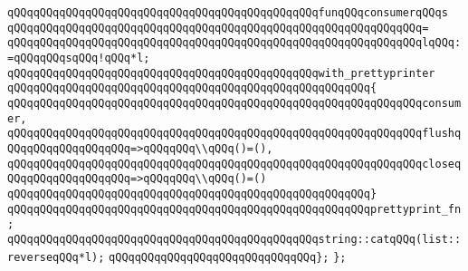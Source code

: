 \verb|qQQqqQQqqQQqqQQqqQQqqQQqqQQqqQQqqQQqqQQqqQQqqQQqfunqQQqconsumerqQQqs|\newline
\verb|qQQqqQQqqQQqqQQqqQQqqQQqqQQqqQQqqQQqqQQqqQQqqQQqqQQqqQQqqQQqqQQq=|\newline
\verb|qQQqqQQqqQQqqQQqqQQqqQQqqQQqqQQqqQQqqQQqqQQqqQQqqQQqqQQqqQQqqQQqlqQQq:=qQQqqQQqsqQQq!qQQq*l;|\newline
\newline
\verb|qQQqqQQqqQQqqQQqqQQqqQQqqQQqqQQqqQQqqQQqqQQqqQQqwith_prettyprinter|\newline
\verb|qQQqqQQqqQQqqQQqqQQqqQQqqQQqqQQqqQQqqQQqqQQqqQQqqQQqqQQq{|\newline
\verb|qQQqqQQqqQQqqQQqqQQqqQQqqQQqqQQqqQQqqQQqqQQqqQQqqQQqqQQqqQQqqQQqconsumer,|\newline
\verb|qQQqqQQqqQQqqQQqqQQqqQQqqQQqqQQqqQQqqQQqqQQqqQQqqQQqqQQqqQQqqQQqflushqQQqqQQqqQQqqQQqqQQq=>qQQqqQQq\\qQQq()=(),|\newline
\verb|qQQqqQQqqQQqqQQqqQQqqQQqqQQqqQQqqQQqqQQqqQQqqQQqqQQqqQQqqQQqqQQqcloseqQQqqQQqqQQqqQQqqQQq=>qQQqqQQq\\qQQq()=()|\newline
\verb|qQQqqQQqqQQqqQQqqQQqqQQqqQQqqQQqqQQqqQQqqQQqqQQqqQQqqQQq}|\newline
\verb|qQQqqQQqqQQqqQQqqQQqqQQqqQQqqQQqqQQqqQQqqQQqqQQqqQQqqQQqprettyprint_fn;|\newline
\newline
\verb|qQQqqQQqqQQqqQQqqQQqqQQqqQQqqQQqqQQqqQQqqQQqqQQqstring::catqQQq(list::reverseqQQq*l);|\newline
\verb|qQQqqQQqqQQqqQQqqQQqqQQqqQQqqQQq};|\newline
\newline
\verb|};|\newline
\newline
\newline


